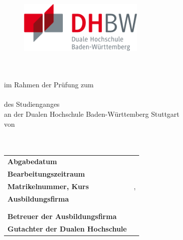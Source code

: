 
\thispagestyle{empty}
\begin{titlepage}
	\enlargethispage{4cm}
	\begin{figure}
		\begin{minipage}{0.49\textwidth}
			\flushleft
		\end{minipage}
		\hfill
		\begin{minipage}{0.49\textwidth}
			\flushright
			\includegraphics[height=2.5cm]{images/logos/dhbw.pdf} 
		\end{minipage}
	\end{figure} 
	\vspace*{0.1cm}
	\begin{center}
		\huge{\textbf{\titel}}\\[1.5cm]
		\Large{\textbf{\arbeit}}\\[0.5cm]
		\normalsize{im Rahmen der Prüfung zum\\[1ex] \textbf{\abschluss}}\\[0.5cm]
		\Large{des Studienganges \studiengang}\\[1ex]
		\normalsize{an der Dualen Hochschule Baden-Württemberg Stuttgart}\\[1cm]
		\normalsize{von}\\[1ex] \Large{\textbf{\vorname\,\nachname}} \\[1cm]
		\normalsize{\bearbeitungsmonat}\\[2.25cm]
		\begin{spacing}{0.8}
			\begin{tabular}{ll}
				\textbf{Abgabedatum}				\hspace{4.5cm}					& \abgabeDatum\\[0.2cm]
				\textbf{Bearbeitungszeitraum}       				&  \bearbeitungszeitraum\\[0.2cm]
				\textbf{Matrikelnummer, Kurs} 					   	&  \matrikelnr, \kurs\\[0.2cm]
				\textbf{Ausbildungsfirma}              					 &  \firmaName\\
																						& \firmaStrasse \\
																				    	& \firmaPlz\\[0.2cm]
				\textbf{Betreuer der Ausbildungsfirma}          &  \betreuerFirma\\[0.2cm]
				\textbf{Gutachter der Dualen Hochschule}    &  \betreuerDhbw\\[0.2cm]
			\end{tabular} 
		\end{spacing}
	\end{center}
\end{titlepage}
